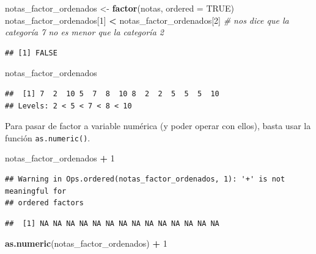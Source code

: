\documentclass[11pt,]{book}
\newenvironment{Shaded}{\begin{snugshade}}{\end{snugshade}}
\newcommand{\CommentTok}[1]{\textcolor[rgb]{0.37,0.37,0.37}{\textit{#1}}}
\newcommand{\DataTypeTok}[1]{\textcolor[rgb]{0.27,0.27,0.27}{#1}}
\newcommand{\DecValTok}[1]{\textcolor[rgb]{0.06,0.06,0.06}{#1}}
\newcommand{\KeywordTok}[1]{\textcolor[rgb]{0.27,0.27,0.27}{\textbf{#1}}}
\newcommand{\NormalTok}[1]{#1}
\newcommand{\OperatorTok}[1]{\textcolor[rgb]{0.43,0.43,0.43}{\textbf{#1}}}
\newcommand{\OtherTok}[1]{\textcolor[rgb]{0.37,0.37,0.37}{#1}}
\newcommand{\StringTok}[1]{\textcolor[rgb]{0.5,0.5,0.5}{#1}}
\begin{document}
\begin{Shaded}
\begin{Highlighting}[]
\NormalTok{notas_factor_ordenados <-}\StringTok{ }\KeywordTok{factor}\NormalTok{(notas, }\DataTypeTok{ordered =} \OtherTok{TRUE}\NormalTok{)}
\NormalTok{notas_factor_ordenados[}\DecValTok{1}\NormalTok{] }\OperatorTok{<}\StringTok{ }\NormalTok{notas_factor_ordenados[}\DecValTok{2}\NormalTok{] }\CommentTok{# nos dice que la categoría 7 no es menor que la categoría 2}
\end{Highlighting}
\end{Shaded}

\begin{verbatim}
## [1] FALSE
\end{verbatim}

\begin{Shaded}
\begin{Highlighting}[]
\NormalTok{notas_factor_ordenados}
\end{Highlighting}
\end{Shaded}

\begin{verbatim}
##  [1] 7  2  10 5  7  8  10 8  2  2  5  5  5  10
## Levels: 2 < 5 < 7 < 8 < 10
\end{verbatim}

Para pasar de factor a variable numérica (y poder operar con ellos), basta usar la función \texttt{as.numeric()}.

\begin{Shaded}
\begin{Highlighting}[]
\NormalTok{notas_factor_ordenados }\OperatorTok{+}\StringTok{ }\DecValTok{1}
\end{Highlighting}
\end{Shaded}

\begin{verbatim}
## Warning in Ops.ordered(notas_factor_ordenados, 1): '+' is not meaningful for
## ordered factors
\end{verbatim}

\begin{verbatim}
##  [1] NA NA NA NA NA NA NA NA NA NA NA NA NA NA
\end{verbatim}

\begin{Shaded}
\begin{Highlighting}[]
\KeywordTok{as.numeric}\NormalTok{(notas_factor_ordenados) }\OperatorTok{+}\StringTok{ }\DecValTok{1}
\end{Highlighting}
\end{Shaded}
\end{document}
